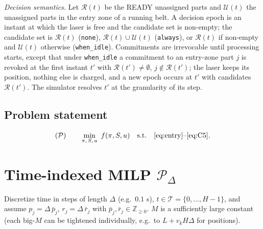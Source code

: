 \documentclass[11pt,a4paper]{article}
\theoremstyle{definition}
\theoremstyle{remark}
\newcommand{\Pb}{\mathcal{P}}
\begin{document}
\emph{Decision semantics.} Let $\mathcal R(t)$ be the READY unassigned parts and
$\mathcal U(t)$ the unassigned parts in the entry zone of a running belt. A decision
epoch is an instant at which the laser is free and the candidate set is non-empty; the
candidate set is $\mathcal R(t)$ (\texttt{none}), $\mathcal R(t)\cup\mathcal U(t)$
(\texttt{always}), or $\mathcal R(t)$ if non-empty and $\mathcal U(t)$ otherwise
(\texttt{when\_idle}). Commitments are irrevocable until processing starts, except
that under \texttt{when\_idle} a commitment to an entry-zone part $j$ is revoked at the
first instant $t'$ with $\mathcal R(t')\neq\emptyset$, $j\notin\mathcal R(t')$; the laser
keeps its position, nothing else is charged, and a new epoch occurs at $t'$ with
candidates $\mathcal R(t')$. The simulator resolves $t'$ at the granularity of its
step.

\subsection{Problem statement}
\[
(\Pb)\qquad \min_{\pi,\,S,\,u}\ f(\pi,S,u)\quad\text{s.t.}\quad
\eqref{eq:entry}\text{--}\eqref{eq:C5}.
\]

\section{Time-indexed MILP \texorpdfstring{$\Pb_\Delta$}{P-Delta}}\label{sec:milp}

Discretize time in steps of length $\Delta$ (e.g.\ $0.1$ s),
$t\in\mathcal T=\{0,\dots,H-1\}$, and assume $p_j=\Delta\,\bar p_j$, $r_j=\Delta\,\bar r_j$
with $\bar p_j,\bar r_j\in\mathbb Z_{\ge0}$. $M$ is a sufficiently large constant
(each big-$M$ can be tightened individually, e.g.\ to $L+v_kH\Delta$ for positions).
\end{document}
